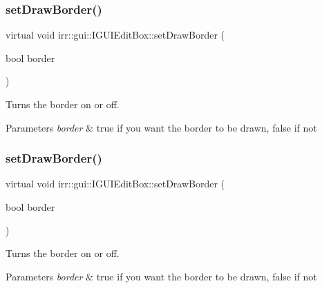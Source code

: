 \subsubsection{\texorpdfstring{set\+Draw\+Border()}{setDrawBorder()}\hspace{0.1cm}{\footnotesize\ttfamily [1/2]}}
{\footnotesize\ttfamily virtual void irr\+::gui\+::\+I\+G\+U\+I\+Edit\+Box\+::set\+Draw\+Border (\begin{DoxyParamCaption}\item[{bool}]{border }\end{DoxyParamCaption})\hspace{0.3cm}{\ttfamily [pure virtual]}}



Turns the border on or off. 


\begin{DoxyParams}{Parameters}
{\em border} & true if you want the border to be drawn, false if not \\
\hline
\end{DoxyParams}
\mbox{\label{classirr_1_1gui_1_1IGUIEditBox_a37094bd4bc6b82a184bd1d7864f7ea18}} 
\subsubsection{\texorpdfstring{set\+Draw\+Border()}{setDrawBorder()}\hspace{0.1cm}{\footnotesize\ttfamily [2/2]}}
{\footnotesize\ttfamily virtual void irr\+::gui\+::\+I\+G\+U\+I\+Edit\+Box\+::set\+Draw\+Border (\begin{DoxyParamCaption}\item[{bool}]{border }\end{DoxyParamCaption})\hspace{0.3cm}{\ttfamily [pure virtual]}}



Turns the border on or off. 


\begin{DoxyParams}{Parameters}
{\em border} & true if you want the border to be drawn, false if not \\
\hline
\end{DoxyParams}
\mbox{\label{classirr_1_1gui_1_1IGUIEditBox_a5253ed6b422e129356e56f8e2a610be5}} 
